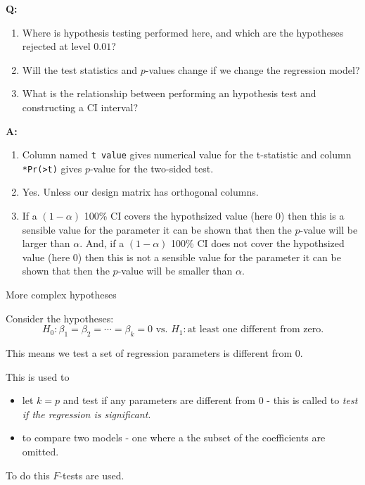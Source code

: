 \documentclass[ignorenonframetext,]{beamer}
\providecommand{\tightlist}{%
  \setlength{\itemsep}{0pt}\setlength{\parskip}{0pt}}
\begin{document}
\begin{frame}[fragile]

\textbf{Q:}

\begin{enumerate}
\def\labelenumi{\arabic{enumi}.}
\tightlist
\item
  Where is hypothesis testing performed here, and which are the
  hypotheses rejected at level \(0.01\)?
\item
  Will the test statistics and \(p\)-values change if we change the
  regression model?
\item
  What is the relationship between performing an hypothesis test and
  constructing a CI interval?
\end{enumerate}

\textbf{A:}

\begin{enumerate}
\def\labelenumi{\arabic{enumi}.}
\tightlist
\item
  Column named \texttt{t\ value} gives numerical value for the
  t-statistic and column
  \texttt{*Pr(\textgreater{}\textbar{}t\textbar{})} gives \(p\)-value
  for the two-sided test.
\item
  Yes. Unless our design matrix has orthogonal columns.
\item
  If a \((1-\alpha)\) 100\% CI covers the hypothsized value (here 0)
  then this is a sensible value for the parameter it can be shown that
  then the \(p\)-value will be larger than \(\alpha\). And, if a
  \((1-\alpha)\) 100\% CI does not cover the hypothsized value (here 0)
  then this is not a sensible value for the parameter it can be shown
  that then the \(p\)-value will be smaller than \(\alpha\).
\end{enumerate}

\end{frame}

\begin{frame}

\begin{block}{More complex hypotheses}

Consider the hypotheses:
\[ H_0: \beta_1=\beta_2=\cdots= \beta_k =0 \text{ vs. } H_1: \text{at least one different from zero}.\]

This means we test a set of regression parameters is different from 0.

This is used to

\begin{itemize}
\tightlist
\item
  let \(k=p\) and test if any parameters are different from 0 - this is
  called to \emph{test if the regression is significant}.
\item
  to compare two models - one where a the subset of the coefficients are
  omitted.
\end{itemize}

To do this \(F\)-tests are used.

\end{block}

\end{frame}
\end{document}
